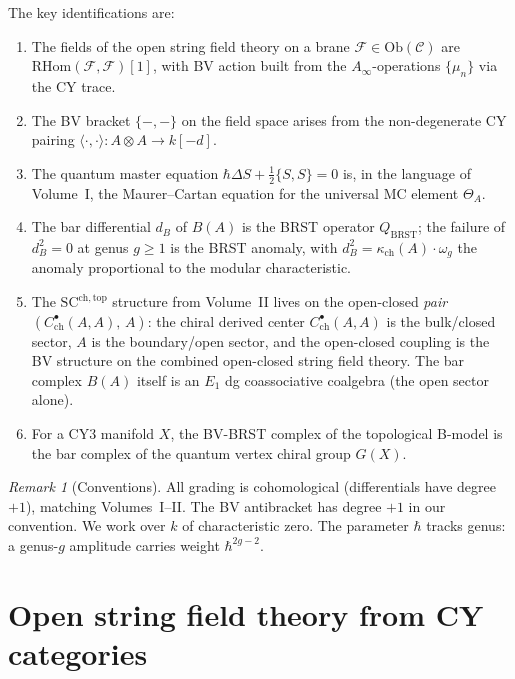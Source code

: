 \documentclass[11pt]{amsart}
\theoremstyle{plain}
\theoremstyle{definition}
\theoremstyle{remark}
\newtheorem{remark}[theorem]{Remark}
\newcommand{\Ainf}{A_\infty}
\newcommand{\RHom}{\mathrm{RHom}}
\newcommand{\BRST}{\mathrm{BRST}}
\newcommand{\SC}{\mathrm{SC}}
\newcommand{\cC}{\mathcal{C}}
\newcommand{\cF}{\mathcal{F}}
\begin{document}
The key identifications are:
\begin{enumerate}[label=(\arabic*)]
 \item The fields of the open string field theory on a brane $\cF \in \mathrm{Ob}(\cC)$ are $\RHom(\cF, \cF)[1]$, with BV action built from the $\Ainf$-operations $\{\mu_n\}$ via the CY trace.
 \item The BV bracket $\{-,-\}$ on the field space arises from the non-degenerate CY pairing $\langle \cdot, \cdot \rangle \colon A \otimes A \to k[-d]$.
 \item The quantum master equation $\hbar \Delta S + \tfrac{1}{2}\{S, S\} = 0$ is, in the language of Volume~I, the Maurer--Cartan equation for the universal MC element $\Theta_A$.
 \item The bar differential $d_B$ of $B(A)$ is the BRST operator $Q_{\BRST}$; the failure of $d_B^2 = 0$ at genus $g \geq 1$ is the BRST anomaly, with $d_B^2 = \kappa_{\mathrm{ch}}(A) \cdot \omega_g$ the anomaly proportional to the modular characteristic.
 \item The $\SC^{\mathrm{ch,top}}$ structure from Volume~II lives on the open-closed \emph{pair} $(C^\bullet_{\mathrm{ch}}(A,A),\, A)$: the chiral derived center $C^\bullet_{\mathrm{ch}}(A,A)$ is the bulk/closed sector, $A$ is the boundary/open sector, and the open-closed coupling is the BV structure on the combined open-closed string field theory. The bar complex $B(A)$ itself is an $E_1$ dg coassociative coalgebra (the open sector alone).
 \item For a CY3 manifold $X$, the BV-BRST complex of the topological B-model is the bar complex of the quantum vertex chiral group $G(X)$.
\end{enumerate}

\begin{remark}[Conventions]
All grading is cohomological (differentials have degree $+1$), matching Volumes~I--II. The BV antibracket has degree $+1$ in our convention. We work over $k$ of characteristic zero. The parameter $\hbar$ tracks genus: a genus-$g$ amplitude carries weight $\hbar^{2g-2}$.
\end{remark}

\section{Open string field theory from CY categories}
\label{sec:open-sft}
\end{document}
